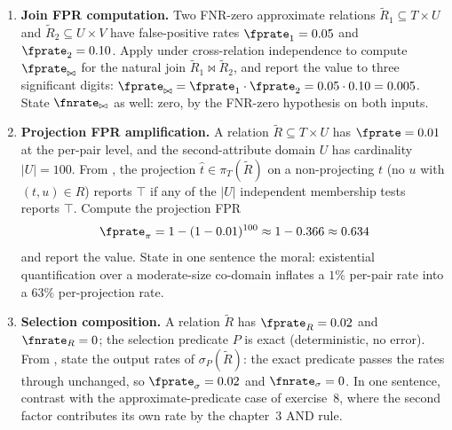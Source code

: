 \begin{enumerate}


\item \exstar
\label{ex:ch12-1}
\textbf{Join FPR computation.}
Two FNR-zero approximate relations $\tilde R_1 \subseteq T \times U$
and $\tilde R_2 \subseteq U \times V$ have false-positive rates
$\fprate_1 = 0.05$ and $\fprate_2 = 0.10$. Apply
 under cross-relation independence to compute
$\fprate_{\bowtie}$ for the natural join
$\tilde R_1 \bowtie \tilde R_2$, and report the value to three
significant digits: $\fprate_{\bowtie} = \fprate_1 \cdot \fprate_2
= 0.05 \cdot 0.10 = 0.005$. State $\fnrate_{\bowtie}$ as well: zero,
by the FNR-zero hypothesis on both inputs.

\item \exstar
\label{ex:ch12-2}
\textbf{Projection FPR amplification.}
A relation $\tilde R \subseteq T \times U$ has $\fprate = 0.01$ at
the per-pair level, and the second-attribute domain $U$ has
cardinality $|U| = 100$. From , the
projection $\hat t \in \pi_T(\tilde R)$ on a non-projecting $t$
(no $u$ with $(t, u) \in R$) reports $\top$ if any of the $|U|$
independent membership tests reports $\top$. Compute the projection
FPR
\[
  \fprate_{\pi} = 1 - (1 - 0.01)^{100} \approx 1 - 0.366 \approx 0.634
\]
and report the value. State in one sentence the moral: existential
quantification over a moderate-size co-domain inflates a $1\%$
per-pair rate into a $63\%$ per-projection rate.

\item \exstar
\label{ex:ch12-3}
\textbf{Selection composition.}
A relation $\tilde R$ has $\fprate_R = 0.02$ and $\fnrate_R = 0$;
the selection predicate $P$ is exact (deterministic, no error).
From , state the output rates of
$\sigma_P(\tilde R)$: the exact predicate passes the rates through
unchanged, so $\fprate_\sigma = 0.02$ and $\fnrate_\sigma = 0$.
In one sentence, contrast with the approximate-predicate case of
exercise~8, where the second factor contributes its own rate by
the chapter~3 AND rule.



\end{enumerate}
